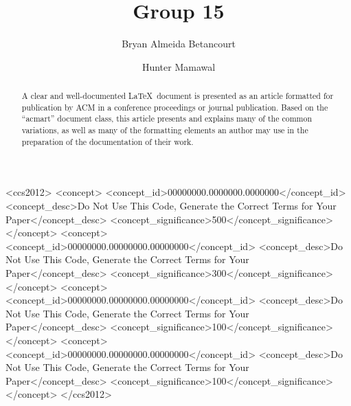 \documentclass[sigconf,authordraft]{acmart}
\begin{document}
\title{Group 15}

\author{Bryan Almeida Betancourt}

\author{Hunter Mamawal}


\renewcommand{\shortauthors}{Trovato et al.}

\begin{abstract}
  A clear and well-documented \LaTeX\ document is presented as an
  article formatted for publication by ACM in a conference proceedings
  or journal publication. Based on the ``acmart'' document class, this
  article presents and explains many of the common variations, as well
  as many of the formatting elements an author may use in the
  preparation of the documentation of their work.
\end{abstract}

\begin{CCSXML}
<ccs2012>
 <concept>
  <concept_id>00000000.0000000.0000000</concept_id>
  <concept_desc>Do Not Use This Code, Generate the Correct Terms for Your Paper</concept_desc>
  <concept_significance>500</concept_significance>
 </concept>
 <concept>
  <concept_id>00000000.00000000.00000000</concept_id>
  <concept_desc>Do Not Use This Code, Generate the Correct Terms for Your Paper</concept_desc>
  <concept_significance>300</concept_significance>
 </concept>
 <concept>
  <concept_id>00000000.00000000.00000000</concept_id>
  <concept_desc>Do Not Use This Code, Generate the Correct Terms for Your Paper</concept_desc>
  <concept_significance>100</concept_significance>
 </concept>
 <concept>
  <concept_id>00000000.00000000.00000000</concept_id>
  <concept_desc>Do Not Use This Code, Generate the Correct Terms for Your Paper</concept_desc>
  <concept_significance>100</concept_significance>
 </concept>
</ccs2012>
\end{CCSXML}
\end{document}
